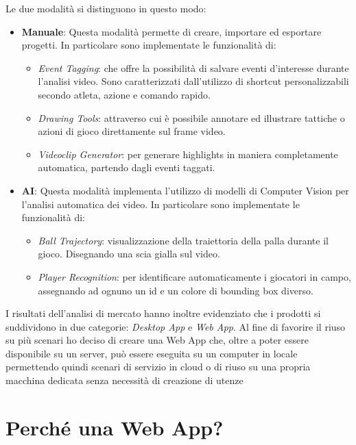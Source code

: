 Le due modalità si distinguono in questo modo:
\begin{itemize}
    \item \textbf{Manuale}: Questa modalità permette di creare, importare ed esportare progetti. In particolare sono implementate le funzionalità di:
    \begin{itemize}
        \item \textit{Event Tagging}: che offre la possibilità di salvare eventi d'interesse durante l'analisi video. Sono caratterizzati dall'utilizzo di shortcut personalizzabili secondo atleta, azione e comando rapido.
        \item \textit{Drawing Tools}: attraverso cui è possibile annotare ed illustrare tattiche o azioni di gioco direttamente sul frame video.
        \item \textit{Videoclip Generator}: per generare highlights in maniera completamente automatica, partendo dagli eventi taggati. 
    \end{itemize}
    \item \textbf{AI}: Questa modalità implementa l'utilizzo di modelli di Computer Vision per l'analisi automatica dei video. In particolare sono implementate le funzionalità di:
    \begin{itemize}
        \item \textit{Ball Trajectory}: visualizzazione della traiettoria della palla durante il gioco. Disegnando una scia gialla sul video.
        \item \textit{Player Recognition}: per identificare automaticamente i giocatori in campo, assegnando ad ognuno un id e un colore di bounding box diverso.
    \end{itemize}   
\end{itemize}

\noindent I risultati dell'analisi di mercato hanno inoltre evidenziato che i prodotti si suddividono in due categorie: \textit{Desktop App} e \textit{Web App}.
Al fine di favorire il riuso su più scenari ho deciso di creare una Web App che, oltre a poter essere disponibile su un server, può essere eseguita su un computer in locale permettendo quindi scenari di servizio in cloud o di riuso su una propria macchina dedicata senza necessità di creazione di utenze

\section{Perché una Web App?}
\label{sec:web_app}

